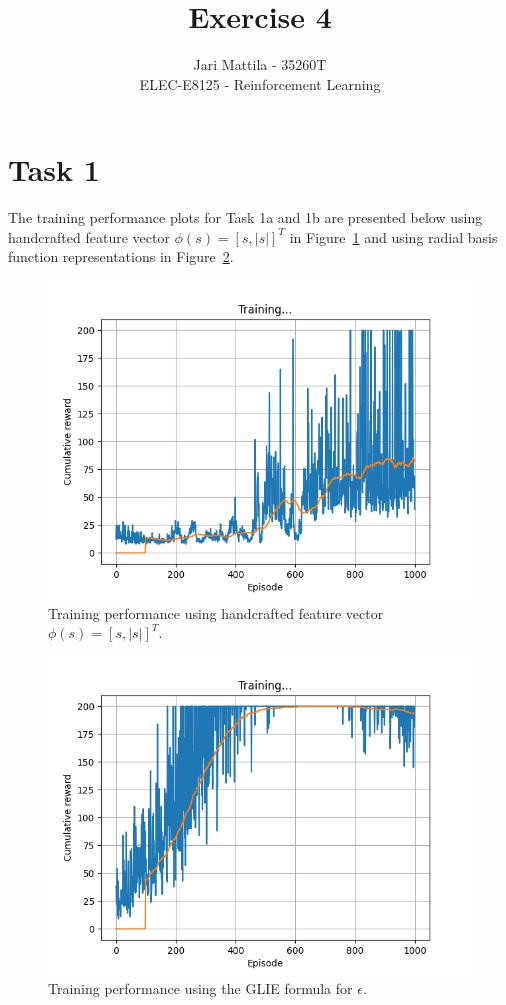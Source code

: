 \documentclass[12pt]{article}
\begin{document}
 
\title{Exercise 4}
\author{Jari Mattila - 35260T\\
ELEC-E8125 - Reinforcement Learning}

\maketitle

\section*{Task 1}

The training performance plots for Task 1a and 1b are presented below using 
handcrafted feature vector $\phi(s) = [s,|s|]^T$ in Figure~\ref*{fig:fig1} and 
using radial basis function representations in Figure~\ref*{fig:fig2}.
\newline

\begin{figure}[h] 
	\centering  %
    \includegraphics[width=0.9\columnwidth]{img/Figure_1_task_1a_cumulative_reward.png}
	\caption{Training performance using handcrafted feature vector $\phi(s) = [s,|s|]^T$.}
	\label{fig:fig1}
\end{figure}

\begin{figure}[h] 
	\centering  %
    \includegraphics[width=0.9\columnwidth]{img/Figure_2_task_1b_cumulative_reward.png}
	\caption{Training performance using the GLIE formula for $\epsilon$.}
	\label{fig:fig2}
\end{figure}
\end{document}
